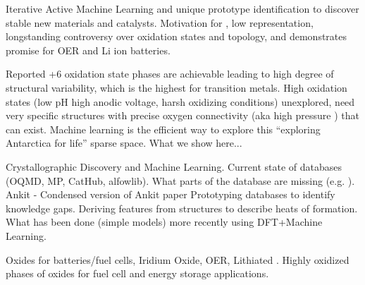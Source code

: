 

Iterative Active Machine Learning and unique prototype identification to discover stable new materials and catalysts.
Motivation for , low representation, longstanding controversy over oxidation states and topology, and demonstrates promise for OER and Li ion batteries.

Reported +6 oxidation state phases are achievable leading to high degree of structural variability, which is the highest for transition metals.
High oxidation states (low pH high anodic voltage, harsh oxidizing conditions) unexplored, need very specific structures with precise oxygen connectivity (aka high pressure ) that can exist.
Machine learning is the efficient way to explore this “exploring Antarctica for life” sparse space.
What we show here...


Crystallographic Discovery and Machine Learning.
Current state of databases (OQMD, MP, CatHub, alfowlib).
What parts of the database are missing (e.g. ).
Ankit - Condensed version of Ankit paper
Prototyping databases to identify knowledge gaps.
Deriving features from structures to describe heats of formation.
What has been done (simple models) more recently using DFT+Machine Learning.


Oxides for batteries/fuel cells, Iridium Oxide, OER, Lithiated .
Highly oxidized phases of oxides for fuel cell and energy storage applications.

